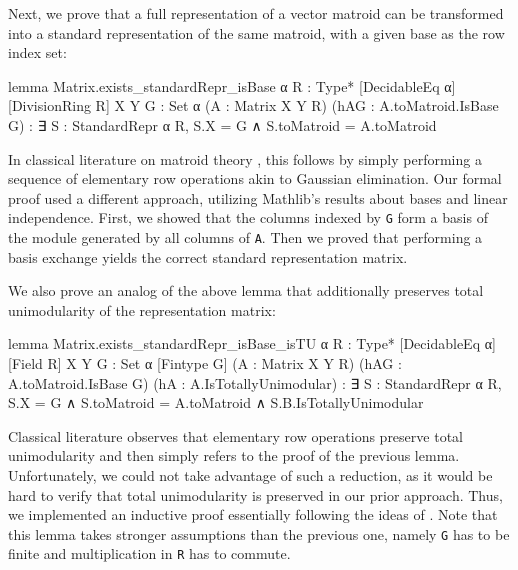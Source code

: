 Next, we prove that a full representation of a vector matroid can be transformed into a standard representation of the same matroid, with a given base as the row index set:
\begin{leancode}
lemma Matrix.exists_standardRepr_isBase
    {α R : Type*} [DecidableEq α] [DivisionRing R]
    {X Y G : Set α} (A : Matrix X Y R)
    (hAG : A.toMatroid.IsBase G) :
    ∃ S : StandardRepr α R,
      S.X = G ∧
      S.toMatroid = A.toMatroid
\end{leancode}
In classical literature on matroid theory \cite{Oxley2011,Truemper2016}, this follows by simply performing a sequence of elementary row operations akin to Gaussian elimination. Our formal proof used a different approach, utilizing Mathlib's results about bases and linear independence. First, we showed that the columns indexed by \texttt{G} form a basis of the module generated by all columns of \texttt{A}. Then we proved that performing a basis exchange yields the correct standard representation matrix.

We also prove an analog of the above lemma that additionally preserves total unimodularity of the representation matrix:
\begin{leancode}
lemma Matrix.exists_standardRepr_isBase_isTU
    {α R : Type*} [DecidableEq α] [Field R]
    {X Y G : Set α} [Fintype G]
    (A : Matrix X Y R)
    (hAG : A.toMatroid.IsBase G)
    (hA : A.IsTotallyUnimodular) :
    ∃ S : StandardRepr α R,
      S.X = G ∧
      S.toMatroid = A.toMatroid ∧
      S.B.IsTotallyUnimodular
\end{leancode}
Classical literature \cite{Oxley2011,Truemper2016} observes that elementary row operations preserve total unimodularity and then simply refers to the proof of the previous lemma. Unfortunately, we could not take advantage of such a reduction, as it would be hard to verify that total unimodularity is preserved in our prior approach. Thus, we implemented an inductive proof essentially following the ideas of \cite{Oxley2011,Truemper2016}. Note that this lemma takes stronger assumptions than the previous one, namely \texttt{G} has to be finite and multiplication in \texttt{R} has to commute.

